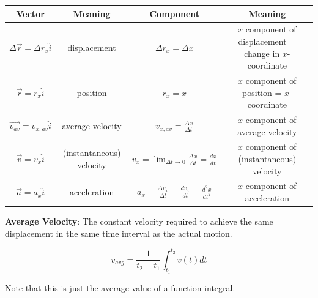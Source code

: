     \begin{center}
        \begin{tabular}{|c|c|c|c|}
            \hline
            \textbf{Vector} & \textbf{Meaning} & \textbf{Component} & \textbf{Meaning} \\
            \hline
            $\Delta \overrightarrow{r} = \Delta r_x \hat{i}$    & displacement & $\Delta r_x = \Delta x$    & $x$ component of displacement = change in $x$-coordinate \\
            \hline
            $\overrightarrow{r} = r_x \hat{i}$  & position & $r_x = x$  & $x$ component of position = $x$-coordinate \\
            \hline
            $\overrightarrow{v_{av}}=v_{x,av}\hat{i}$ & average velocity & $v_{x,av} = \frac{\Delta x}{\Delta t}$ & $x$ component of average velocity \\
            \hline
            $\overrightarrow{v} = v_x \hat{i}$ & (instantaneous) velocity   & $v_x = \lim_{\Delta t\to 0} \frac{\Delta x}{\Delta t} = \frac{dx}{dt}$ & $x$ component of (instantaneous) velocity \\
            \hline
            $\overrightarrow{a} = a_x \hat{i}$ & acceleration & $a_x = \frac{\Delta v_x}{\Delta t} = \frac{dv_x}{dt} = \frac{d^2 x}{dt^2}$ & $x$ component of acceleration \\
            \hline
        \end{tabular}
    \end{center}

    \textbf{Average Velocity}: The constant velocity required to achieve the same displacement in the same time interval as the actual motion.

    \[
        v_{avg} = \frac{1}{t_2 - t_1} \int^{t_2}_{t_1} v(t) dt
    \]

    Note that this is just the average value of a function integral.